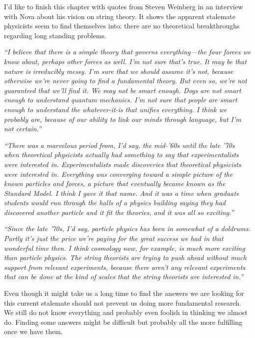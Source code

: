 \noindent I'd like to finish this chapter with quotes from Steven Weinberg in an interview with Nova about his vision on string theory. It shows the apparent stalemate physicists seem to find themselves into: there are no theoretical breakthroughs regarding long standing problems.

\begin{center}
\begin{minipage}[5cm]{0.9\textwidth}
\textit{``I believe that there is a simple theory that governs everything—the four forces we know about, perhaps other forces as well. I'm not sure that's true. It may be that nature is irreducibly messy. I'm sure that we should assume it's not, because otherwise we're never going to find a fundamental theory. But even so, we're not guaranteed that we'll find it. We may not be smart enough. Dogs are not smart enough to understand quantum mechanics. I'm not sure that people are smart enough to understand the whatever-it-is that unifies everything. I think we probably are, because of our ability to link our minds through language, but I'm not certain.''}
\end{minipage} 
\end{center}

\begin{center}
\begin{minipage}[5cm]{0.9\textwidth}
\textit{\noindent ``There was a marvelous period from, I'd say, the mid-'60s until the late '70s when theoretical physicists actually had something to say that experimentalists were interested in. Experimentalists made discoveries that theoretical physicists were interested in. Everything was converging toward a simple picture of the known particles and forces, a picture that eventually became known as the Standard Model. I think I gave it that name. And it was a time when graduate students would run through the halls of a physics building saying they had discovered another particle and it fit the theories, and it was all so exciting.''}
\end{minipage} 
\end{center}

\begin{center}
\begin{minipage}[5cm]{0.9\textwidth}
\textit{\noindent ``Since the late '70s, I'd say, particle physics has been in somewhat of a doldrums. Partly it's just the price we're paying for the great success we had in that wonderful time then. I think cosmology now, for example, is much more exciting than particle physics. The string theorists are trying to push ahead without much support from relevant experiments, because there aren't any relevant experiments that can be done at the kind of scales that the string theorists are interested in.''}
\end{minipage} 
\end{center}

\noindent Even though it might take us a long time to find the answers we are looking for this current stalemate should not prevent us doing more fundamental research. We still do not know everything and probably even foolish in thinking we almost do. Finding some answers might be difficult but probably all the more fulfilling once we have them.